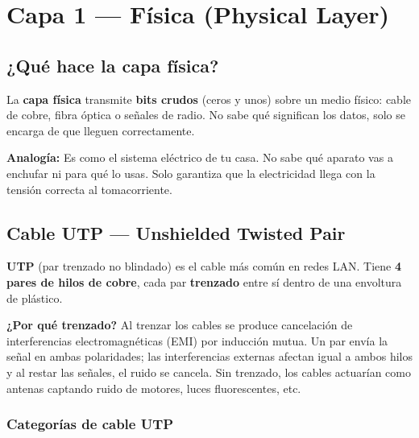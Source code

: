 \chapter{ Capa 1 --- Física (Physical Layer)}

\section{ ¿Qué hace la capa física?}

\begin{concepto}
La \textbf{capa física} transmite \textbf{bits crudos} (ceros y unos) sobre un
medio físico: cable de cobre, fibra óptica o señales de radio. No sabe qué
significan los datos, solo se encarga de que lleguen correctamente.

 \textbf{Analogía:} Es como el sistema eléctrico de tu casa.
No sabe qué aparato vas a enchufar ni para qué lo usas. Solo garantiza que
la electricidad llega con la tensión correcta al tomacorriente.
\end{concepto}

\section{ Cable UTP --- Unshielded Twisted Pair}

\begin{concepto}
\textbf{UTP} (par trenzado no blindado) es el cable más común en redes LAN.
Tiene \textbf{4 pares de hilos de cobre}, cada par \textbf{trenzado} entre sí
dentro de una envoltura de plástico.

 \textbf{¿Por qué trenzado?} Al trenzar los cables se produce
cancelación de interferencias electromagnéticas (EMI) por inducción mutua.
Un par envía la señal en ambas polaridades; las interferencias externas afectan
igual a ambos hilos y al restar las señales, el ruido se cancela. Sin trenzado,
los cables actuarían como antenas captando ruido de motores, luces fluorescentes, etc.
\end{concepto}

\subsection{Categorías de cable UTP}

